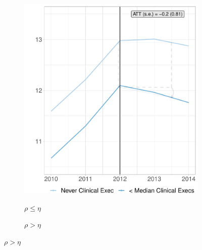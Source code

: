 \documentclass[12pt]{article}
\begin{document}
            \begin{figure}[ht!]
     \caption{Effect of Clinical Training on Mortality Rates, Binned Treatment}
     \centering
     \begin{subfigure}[b]{0.45\textwidth}
         \centering
         \caption{$\rho \leq \eta$}
         \includegraphics[width=\textwidth]{Objects/cont_belowmedmort_md_nomd_size_synth_graph.pdf}
         \label{fig:belowmed_read_synth_clinical}
     \end{subfigure}
     \hfill
     \begin{subfigure}[b]{0.45\textwidth}
         \centering
         \caption{$\rho > \eta$}

\end{subfigure}
\end{figure}
\end{document}
